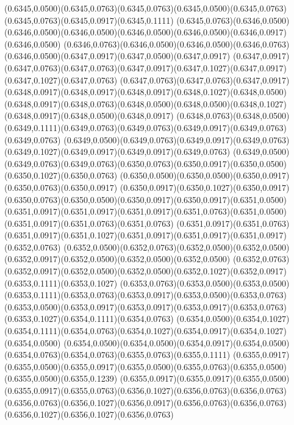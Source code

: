 (0.6345,0.0500)(0.6345,0.0763)(0.6345,0.0763)(0.6345,0.0500)(0.6345,0.0763)(0.6345,0.0763)(0.6345,0.0917)(0.6345,0.1111)
(0.6345,0.0763)(0.6346,0.0500)(0.6346,0.0500)(0.6346,0.0500)(0.6346,0.0500)(0.6346,0.0500)(0.6346,0.0917)(0.6346,0.0500)
(0.6346,0.0763)(0.6346,0.0500)(0.6346,0.0500)(0.6346,0.0763)(0.6346,0.0500)(0.6347,0.0917)(0.6347,0.0500)(0.6347,0.0917)
(0.6347,0.0917)(0.6347,0.0763)(0.6347,0.0763)(0.6347,0.0917)(0.6347,0.1027)(0.6347,0.0917)(0.6347,0.1027)(0.6347,0.0763)
(0.6347,0.0763)(0.6347,0.0763)(0.6347,0.0917)(0.6348,0.0917)(0.6348,0.0917)(0.6348,0.0917)(0.6348,0.1027)(0.6348,0.0500)
(0.6348,0.0917)(0.6348,0.0763)(0.6348,0.0500)(0.6348,0.0500)(0.6348,0.1027)(0.6348,0.0917)(0.6348,0.0500)(0.6348,0.0917)
(0.6348,0.0763)(0.6348,0.0500)(0.6349,0.1111)(0.6349,0.0763)(0.6349,0.0763)(0.6349,0.0917)(0.6349,0.0763)(0.6349,0.0763)
(0.6349,0.0500)(0.6349,0.0763)(0.6349,0.0917)(0.6349,0.0763)(0.6349,0.1027)(0.6349,0.0917)(0.6349,0.0917)(0.6349,0.0763)
(0.6349,0.0500)(0.6349,0.0763)(0.6349,0.0763)(0.6350,0.0763)(0.6350,0.0917)(0.6350,0.0500)(0.6350,0.1027)(0.6350,0.0763)
(0.6350,0.0500)(0.6350,0.0500)(0.6350,0.0917)(0.6350,0.0763)(0.6350,0.0917)
\PST@Solid(0.6350,0.0917)(0.6350,0.1027)(0.6350,0.0917)(0.6350,0.0763)(0.6350,0.0500)(0.6350,0.0917)(0.6350,0.0917)(0.6351,0.0500)
(0.6351,0.0917)(0.6351,0.0917)(0.6351,0.0917)(0.6351,0.0763)(0.6351,0.0500)(0.6351,0.0917)(0.6351,0.0763)(0.6351,0.0763)
(0.6351,0.0917)(0.6351,0.0763)(0.6351,0.0917)(0.6351,0.1027)(0.6351,0.0917)(0.6351,0.0917)(0.6351,0.0917)(0.6352,0.0763)
(0.6352,0.0500)(0.6352,0.0763)(0.6352,0.0500)(0.6352,0.0500)(0.6352,0.0917)(0.6352,0.0500)(0.6352,0.0500)(0.6352,0.0500)
(0.6352,0.0763)(0.6352,0.0917)(0.6352,0.0500)(0.6352,0.0500)(0.6352,0.1027)(0.6352,0.0917)(0.6353,0.1111)(0.6353,0.1027)
(0.6353,0.0763)(0.6353,0.0500)(0.6353,0.0500)(0.6353,0.1111)(0.6353,0.0763)(0.6353,0.0917)(0.6353,0.0500)(0.6353,0.0763)
(0.6353,0.0500)(0.6353,0.0917)(0.6353,0.0917)(0.6353,0.0917)(0.6353,0.0763)(0.6353,0.1027)(0.6354,0.1111)(0.6354,0.0763)
(0.6354,0.0500)(0.6354,0.1027)(0.6354,0.1111)(0.6354,0.0763)(0.6354,0.1027)(0.6354,0.0917)(0.6354,0.1027)(0.6354,0.0500)
(0.6354,0.0500)(0.6354,0.0500)(0.6354,0.0917)(0.6354,0.0500)(0.6354,0.0763)(0.6354,0.0763)(0.6355,0.0763)(0.6355,0.1111)
(0.6355,0.0917)(0.6355,0.0500)(0.6355,0.0917)(0.6355,0.0500)(0.6355,0.0763)(0.6355,0.0500)(0.6355,0.0500)(0.6355,0.1239)
(0.6355,0.0917)(0.6355,0.0917)(0.6355,0.0500)(0.6355,0.0917)(0.6355,0.0763)(0.6356,0.1027)(0.6356,0.0763)(0.6356,0.0763)
(0.6356,0.0763)(0.6356,0.1027)(0.6356,0.0917)(0.6356,0.0763)(0.6356,0.0763)(0.6356,0.1027)(0.6356,0.1027)(0.6356,0.0763)
